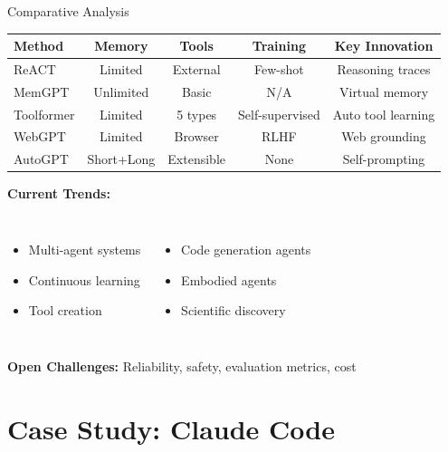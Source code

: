 \documentclass[aspectratio=169]{beamer}
\begin{document}
\begin{frame}{Comparative Analysis}
	\begin{center}
		\small
		\begin{tabular}{|l|c|c|c|c|}
			\hline
			\textbf{Method} & \textbf{Memory} & \textbf{Tools} & \textbf{Training} & \textbf{Key Innovation} \\
			\hline
			ReACT & Limited & External & Few-shot & Reasoning traces \\
			MemGPT & {\color{highlight}Unlimited} & Basic & N/A & Virtual memory \\
			Toolformer & Limited & {\color{highlight}5 types} & Self-supervised & Auto tool learning \\
			WebGPT & Limited & Browser & {\color{highlight}RLHF} & Web grounding \\
			AutoGPT & Short+Long & Extensible & None & {\color{highlight}Self-prompting} \\
			\hline
		\end{tabular}
	\end{center}
	
	\vspace{0.5cm}
	
	\textbf{Current Trends:}
	\begin{columns}
		\begin{itemize}
			\item Multi-agent systems
			\item Continuous learning
			\item Tool creation
		\end{itemize}
		
		\begin{itemize}
			\item Code generation agents
			\item Embodied agents
			\item Scientific discovery
		\end{itemize}
	\end{columns}
	
	\vspace{0.3cm}
	\textbf{Open Challenges:} Reliability, safety, evaluation metrics, cost
\end{frame}

\section{Case Study: Claude Code}
\end{document}
